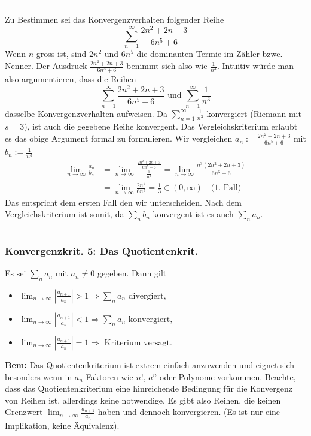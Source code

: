 \documentclass[a4paper,landscape,8pt]{extarticle}
\newcommand{\abs}[1]{\left\lvert #1 \right\rvert}
\newcommand{\sep}{\vspace{5pt}\noindent\hrule\vspace{5pt}}
\newcommand{\Bem}{\textbf{Bem: }}
\begin{document}
\begin{multicols*}{4}
\begin{warmup}
\sep

\Bsp Zu Bestimmen sei das Konvergenzverhalten folgender Reihe
\[
\sum_{n=1}^{\infty} \frac{2n^2+2n+3}{6n^5+6}
\]
Wenn $n$ gross ist, sind $2n^2$ und $6n^5$ die dominanten Termie im Zähler bzwe.
Nenner. Der Ausdruck $\frac{2n^2+2n+3}{6n^5+6}$ benimmt sich also wie
$\frac{1}{n^3}$. Intuitiv würde man also argumentieren, dass die Reihen
\[
\sum_{n=1}^{\infty} \frac{2n^2+2n+3}{6n^5+6} \text{ und } \sum_{n=1}^\infty
\frac{1}{n^3}
\]
dasselbe Konvergenzverhalten aufweisen. Da $\sum_{n=1}^\infty\frac{1}{n^3}$
konvergiert (Riemann mit $s=3$), ist auch die gegebene Reihe konvergent. Das
Vergleichskriterium erlaubt es das obige Argument formal zu formulieren. Wir
vergleichen $a_n:= \frac{2n^2+2n+3}{6n^5+6}$ mit $b_n := \frac{1}{n^3}$
\begin{align*}
\lim_{n\to\infty}\frac{a_n}{b_n} &=
\lim_{n\to\infty}\frac{\frac{2n^2+2n+3}{6n^5+6}}{\frac{1}{n^3}}
= \lim_{n\to\infty}\frac{n^3(2n^2+2n+3)}{6n^5+6}\\
&= \lim_{n\to\infty} \frac{2n^5}{6n^5} = \frac{1}{3} \in (0,\infty) \quad
\text{(1. Fall)}
\end{align*}
Das entspricht dem ersten Fall den wir unterscheiden. Nach dem
Vergleichskriterium ist somit, da $\sum_n b_n$ konvergent ist es auch $\sum_n
a_n$.
\end{warmup}

\sep

\subsubsection{Konvergenzkrit. 5: Das Quotientenkrit.}

\Satz[Quotientenkriterium] Es sei $\sum_n a_n$ mit $a_n\neq 0$ gegeben. Dann
gilt
\begin{itemize}
  \item $
  \lim_{n\to\infty}\abs{\frac{a_{n+1}}{a_n}} > 1 \Longrightarrow \sum_n a_n
  \text{ divergiert},
  $
  \item $
  \lim_{n\to\infty}\abs{\frac{a_{n+1}}{a_n}} < 1 \Longrightarrow \sum_n a_n
  \text{ konvergiert},
  $
  \item $
  \lim_{n\to\infty}\abs{\frac{a_{n+1}}{a_n}} = 1 \Longrightarrow 
  \text{ Kriterium versagt.}
  $
\end{itemize}

\Bem Das Quotientenkriterium ist extrem einfach anzuwenden und eignet sich
besonders wenn in $a_n$ Faktoren wie $n!$, $a^n$ oder Polynome vorkommen.
Beachte, dass das Quotientenkriterium eine hinreichende Bedingung für die
Konvergenz von Reihen ist, allerdings keine notwendige. Es gibt also Reihen, die
keinen Grenzwert $\lim_{n\to\infty} \frac{a_{n+1}}{a_n}$ haben und dennoch
konvergieren. (Es ist nur eine Implikation, keine Äquivalenz).


\end{multicols*}
\end{document}
